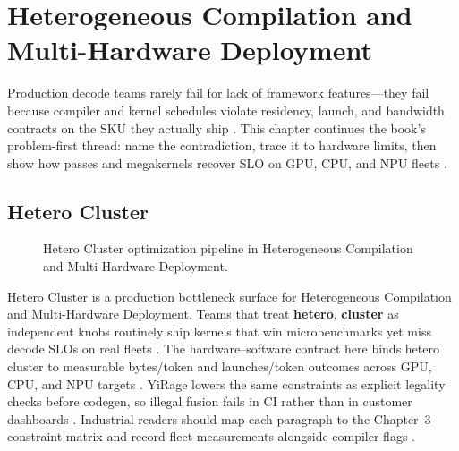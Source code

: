 \chapter{Heterogeneous Compilation and Multi-Hardware Deployment}
\label{chap:ch24}

Production decode teams rarely fail for lack of framework features---they fail because compiler and kernel schedules violate residency, launch, and bandwidth contracts on the SKU they actually ship \citep{patel2025llminference,nvidia2022hopper}. This chapter continues the book's problem-first thread: name the contradiction, trace it to hardware limits, then show how passes and megakernels recover SLO on GPU, CPU, and NPU fleets \citep{taxbreak2026,semianalysis2024tma}.

\section{Hetero Cluster}
\label{sec:hetero_cluster}
\begin{figure}[t]
\centering
{}
\caption{Hetero Cluster optimization pipeline in Heterogeneous Compilation and Multi-Hardware Deployment.}
\label{fig:hetero_cluster_pipeline}
\end{figure}


Hetero Cluster is a production bottleneck surface for Heterogeneous Compilation and Multi-Hardware Deployment. Teams that treat \textbf{hetero}, \textbf{cluster} as independent knobs routinely ship kernels that win microbenchmarks yet miss decode SLOs on real fleets \citep{patel2025llminference,nvidia2022hopper}. The hardware--software contract here binds hetero cluster to measurable bytes/token and launches/token outcomes across GPU, CPU, and NPU targets \citep{taxbreak2026,semianalysis2024tma}. YiRage lowers the same constraints as explicit legality checks before codegen, so illegal fusion fails in CI rather than in customer dashboards \citep{memoryfloor2026,amd2024xdna}. Industrial readers should map each paragraph to the Chapter~3 constraint matrix and record fleet measurements alongside compiler flags \citep{nvidia2022hopper,amd2024aie}.

